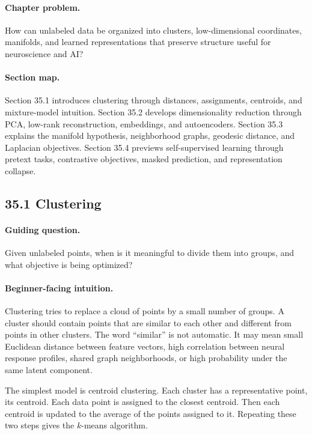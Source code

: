 \paragraph{Chapter problem.}
How can unlabeled data be organized into clusters, low-dimensional coordinates, manifolds, and learned representations that preserve structure useful for neuroscience and AI?

\paragraph{Section map.}
Section 35.1 introduces clustering through distances, assignments, centroids, and mixture-model intuition. Section 35.2 develops dimensionality reduction through PCA, low-rank reconstruction, embeddings, and autoencoders. Section 35.3 explains the manifold hypothesis, neighborhood graphs, geodesic distance, and Laplacian objectives. Section 35.4 previews self-supervised learning through pretext tasks, contrastive objectives, masked prediction, and representation collapse.

\subsection{35.1 Clustering}

\paragraph{Guiding question.}
Given unlabeled points, when is it meaningful to divide them into groups, and what objective is being optimized?

\paragraph{Beginner-facing intuition.}
Clustering tries to replace a cloud of points by a small number of groups. A cluster should contain points that are similar to each other and different from points in other clusters. The word ``similar'' is not automatic. It may mean small Euclidean distance between feature vectors, high correlation between neural response profiles, shared graph neighborhoods, or high probability under the same latent component.

The simplest model is centroid clustering. Each cluster has a representative point, its centroid. Each data point is assigned to the closest centroid. Then each centroid is updated to the average of the points assigned to it. Repeating these two steps gives the \(k\)-means algorithm.

